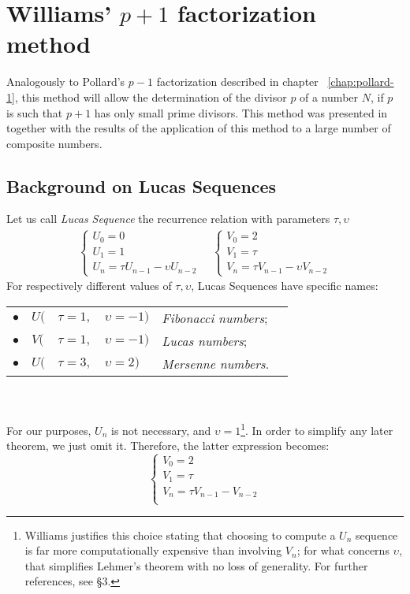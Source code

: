 \chapter{Williams' $p+1$ factorization method \label{chap:william+1}}

Analogously to Pollard's $p-1$ factorization described in chapter
~\ref{chap:pollard-1}, this method will allow the determination of the divisor
$p$ of a number $N$, if $p$ is such that $p+1$ has only small prime divisors.
This method was presented in ~\cite{Williams:p+1} together with the results of
the application of this method to a large number of composite numbers.

\section{Background on Lucas Sequences}

Let us call \emph{Lucas Sequence} the recurrence relation with parameters $\tau,
\upsilon$
\begin{align*}
  \begin{cases}
    U_0 = 0 \\
    U_1 = 1 \\
    U_n = \tau U_{n-1} - \upsilon U_{n-2}
  \end{cases}
  \quad
  \begin{cases}
    V_0 = 2 \\
    V_1 = \tau \\
    V_n = \tau V_{n-1} - \upsilon V_{n-2}
  \end{cases}
\end{align*}
For respectively different values of $\tau, \upsilon$, Lucas Sequences have
specific names:

\begin{tabular}{c l@{\hskip 0pt} l@{\hskip 1pt} l l l}
  $\bullet$ & $U($ & $\tau=1,$ & $\upsilon=-1)$ & \emph{Fibonacci numbers}; \\
  $\bullet$ & $V($ & $\tau=1,$ & $\upsilon=-1)$ & \emph{Lucas numbers}; \\
  $\bullet$ & $U($ & $\tau=3,$ & $\upsilon=2)$ & \emph{Mersenne numbers}.\\
\end{tabular}
\\
\\
For our purposes, $U_n$ is not necessary, and $\upsilon=1$\footnote{
  Williams justifies this choice stating that choosing to compute a $U_n$ sequence
  is far more computationally expensive than involving $V_n$; for what
  concerns $\upsilon$, that simplifies Lehmer's theorem with no loss of
  generality. For further references,
  see \cite{Williams:p+1} \S 3.}.
In order to simplify any later theorem, we just omit it. Therefore, the latter
expression becomes:
\begin{equation}
  \label{eq:williams:ls}
  \begin{cases}
    V_0 = 2 \\
    V_1 = \tau \\
    V_n = \tau V_{n-1} - V_{n-2} \\
  \end{cases}
\end{equation}

